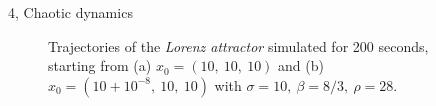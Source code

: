 \documentclass[10pt,a4paper]{article}
\begin{document}
\begin{task}{4, Chaotic dynamics}
\begin{figure}[H]
    \centering
    \hfill
    \caption{Trajectories of the \textit{Lorenz attractor} simulated for 200 seconds, starting from (a) $x_0 = (10,\ 10,\ 10)$ and (b) $\hat{x}_0 = (10+10^{-8},\ 10,\ 10)$ with $\sigma = 10,\ \beta = 8/3,\ \rho = 28$.}
    \label{fig:lorenz-trajs-200s}
\end{figure}


\end{task}
\end{document}
